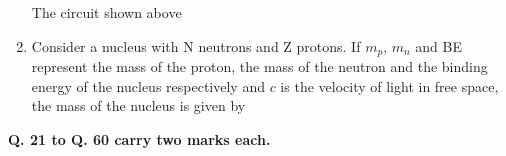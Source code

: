 \documentclass[14pt, a4paper]{extarticle}
\begin{document}
\begin{enumerate}[label=\textbf{Q. \arabic*}]
The circuit shown above
\begin{enumerate}[label=(\Alph*)]
\end{enumerate}

\item Consider a nucleus with N neutrons and Z protons. If $m_p$, $m_n$ and BE represent the mass of the proton, the mass of the neutron and the binding energy of the nucleus respectively and $c$ is the velocity of light in free space, the mass of the nucleus is given by
    \begin{enumerate}[label=(\Alph*)]
    \end{enumerate}
\end{enumerate}

\vspace{1.5em}
\noindent 
\textbf{Q. 21 to Q. 60 carry two marks each.}
\vspace{1em}
\end{document}
